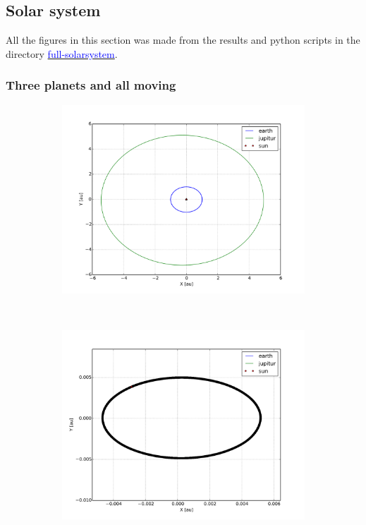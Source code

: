 \subsection{Solar system}

All the figures in this section was made from the results and python scripts in the directory \href{https://github.com/erikfsk/Project-3/tree/master/Project3/full-solarsystem}{\textcolor{blue}{full-solarsystem}}.

\subsubsection{Three planets and all moving}

\begin{figure}[H]
    \centering
    \begin{subfigure}{0.5\textwidth}
        \centering
        \includegraphics[width=\linewidth]{result/bilder/all-moving-jupitur.png}
        \caption{}
    \end{subfigure}%
    ~ 
    \begin{subfigure}{0.5\textwidth}
        \centering
        \includegraphics[width=\linewidth]{result/bilder/all-moving-jupitur-mass-center.png}

\end{subfigure}
\end{figure}
